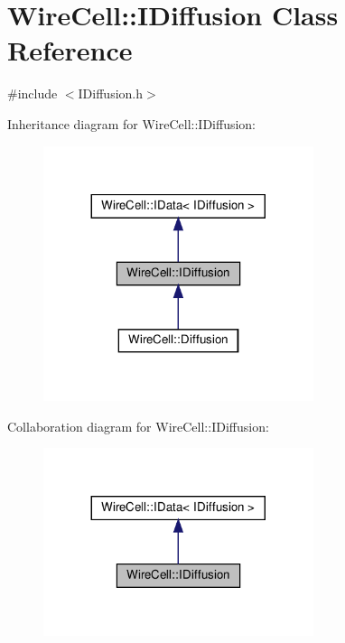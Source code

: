 \hypertarget{class_wire_cell_1_1_i_diffusion}{}\section{Wire\+Cell\+:\+:I\+Diffusion Class Reference}
\label{class_wire_cell_1_1_i_diffusion}


{\ttfamily \#include $<$I\+Diffusion.\+h$>$}



Inheritance diagram for Wire\+Cell\+:\+:I\+Diffusion\+:
\nopagebreak
\begin{figure}[H]
\begin{center}
\leavevmode
\includegraphics[width=224pt]{class_wire_cell_1_1_i_diffusion__inherit__graph}
\end{center}
\end{figure}


Collaboration diagram for Wire\+Cell\+:\+:I\+Diffusion\+:
\nopagebreak
\begin{figure}[H]
\begin{center}
\leavevmode
\includegraphics[width=224pt]{class_wire_cell_1_1_i_diffusion__coll__graph}
\end{center}
\end{figure}
